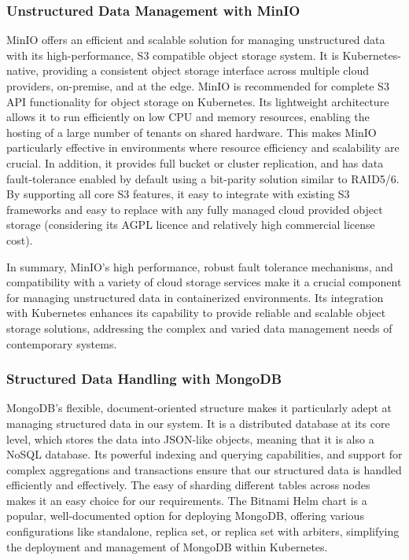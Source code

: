 \documentclass{report}
\begin{document}
    \subsubsection{Unstructured Data Management with MinIO}
    MinIO offers an efficient and scalable solution for managing unstructured data with its high-performance, S3 compatible object storage system. It is Kubernetes-native, providing a consistent object storage interface across multiple cloud providers, on-premise, and at the edge. MinIO is recommended for complete S3 API functionality for object storage on Kubernetes. Its lightweight architecture allows it to run efficiently on low CPU and memory resources, enabling the hosting of a large number of tenants on shared hardware. This makes MinIO particularly effective in environments where resource efficiency and scalability are crucial. In addition, it provides full bucket or cluster replication, and has data fault-tolerance enabled by default using a bit-parity solution similar to RAID5/6. By supporting all core S3 features, it easy to integrate with existing S3 frameworks and easy to replace with any fully managed cloud provided object storage (considering its AGPL licence and relatively high commercial license cost).

    In summary, MinIO's high performance, robust fault tolerance mechanisms, and compatibility with a variety of cloud storage services make it a crucial component for managing unstructured data in containerized environments. Its integration with Kubernetes enhances its capability to provide reliable and scalable object storage solutions, addressing the complex and varied data management needs of contemporary systems.

    \subsubsection{Structured Data Handling with MongoDB}
    MongoDB's flexible, document-oriented structure makes it particularly adept at managing structured data in our system. It is a distributed database at its core level, which stores the data into JSON-like objects, meaning that it is also a NoSQL database. Its powerful indexing and querying capabilities, and support for complex aggregations and transactions ensure that our structured data is handled efficiently and effectively. The easy of sharding different tables across nodes makes it an easy choice for our requirements. The Bitnami Helm chart is a popular, well-documented option for deploying MongoDB, offering various configurations like standalone, replica set, or replica set with arbiters, simplifying the deployment and management of MongoDB within Kubernetes.
\end{document}
